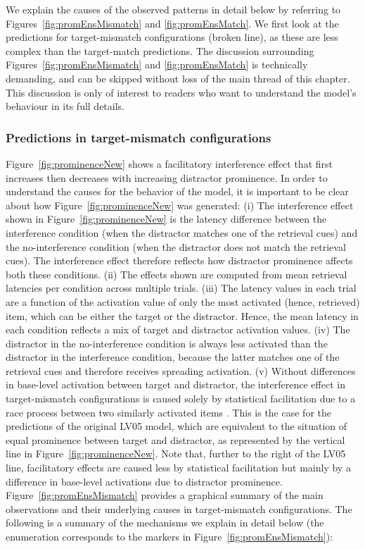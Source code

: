 \documentclass{cambridge7A}\usepackage[]{graphicx}\usepackage[]{color}
\begin{document}
We explain the causes of the observed patterns in detail below by referring to Figures~\ref{fig:promEnsMismatch} and \ref{fig:promEnsMatch}. We first look at the predictions for target-mismatch configurations (broken line), as these are less complex than the target-match predictions. The discussion surrounding Figures~\ref{fig:promEnsMismatch} and \ref{fig:promEnsMatch} is technically demanding, and can be skipped without loss of the main thread of this chapter. This discussion is only of interest to readers who want to understand the model's behaviour in its full details.

\subsubsection{Predictions in target-mismatch configurations}\label{promexpl}
Figure~\ref{fig:prominenceNew} shows a  facilitatory interference effect that first increases then decreases with increasing  distractor prominence.
In order to understand the causes for the behavior of the model, it is important to be clear about how Figure~\ref{fig:prominenceNew} was generated: 
(i) The  interference effect shown in Figure~\ref{fig:prominenceNew} is the latency difference between the interference condition (when the distractor matches one of the retrieval cues) and the no-interference condition (when the distractor does not match the retrieval cues). The interference effect therefore reflects how distractor prominence affects both these conditions.
(ii) The effects shown are computed from mean retrieval latencies per condition across multiple trials. 
(iii) The latency values in each trial are a function of the activation value of only the most activated (hence, retrieved) item, which can be either the target or the distractor. Hence, the mean latency in each condition reflects a mix of target and distractor activation values.
(iv) The distractor in the no-interference condition is always less activated than the distractor in the interference condition, because the latter matches one of the retrieval cues and therefore receives spreading activation.
(v) Without differences in base-level activation between target and distractor, the interference effect in target-mismatch configurations is caused solely by  statistical facilitation due to a  race process between two similarly activated items \citep{raab1962division}.
This is the case for the predictions of the original LV05 model, which are equivalent to the situation of equal prominence between target and distractor, as represented by the vertical line in Figure~\ref{fig:prominenceNew}. 
Note that, further to the right of the LV05 line, facilitatory effects are caused less by statistical facilitation but mainly by a difference in base-level activations due to distractor prominence.
Figure~\ref{fig:promEnsMismatch} provides a graphical summary of the main observations and their underlying causes in target-mismatch configurations. 
The following is a summary of the mechanisms we explain in detail below (the enumeration corresponds to the markers in Figure~\ref{fig:promEnsMismatch}):
\end{document}
